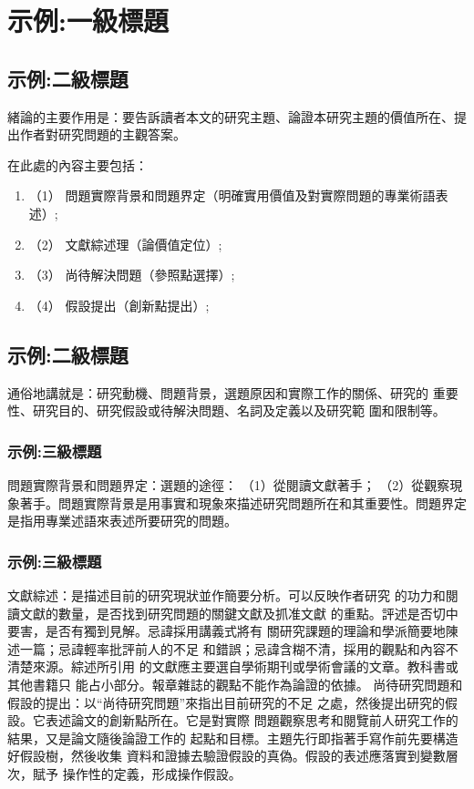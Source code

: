 \section{示例:一級標題}
\subsection{示例:二級標題}
緒論的主要作用是：要告訴讀者本文的研究主題、論證本研究主題的價值所在、提出作者對研究問題的主觀答案。

\par 在此處的內容主要包括：
\begin{enumerate}
	\item[] （1） 問題實際背景和問題界定（明確實用價值及對實際問題的專業術語表述）;
	\item[] （2） 文獻綜述理（論價值定位）;
	\item[]	（3） 尚待解決問題（參照點選擇）;
	\item[] （4） 假設提出（創新點提出）;
\end{enumerate}


\subsection{示例:二級標題}
\par 通俗地講就是：研究動機、問題背景，選題原因和實際工作的關係、研究的
重要性、研究目的、研究假設或待解決問題、名詞及定義以及研究範
圍和限制等。

\subsubsection{示例:三級標題}
\par  問題實際背景和問題界定：選題的途徑：
（1）從閱讀文獻著手；
（2）從觀察現象著手。問題實際背景是用事實和現象來描述研究問題所在和其重要性。問題界定是指用專業述語來表述所要研究的問題。
\clearpage

\subsubsection{示例:三級標題}
\par 文獻綜述：是描述目前的研究現狀並作簡要分析。可以反映作者研究
的功力和閱讀文獻的數量，是否找到研究問題的關鍵文獻及抓准文獻
的重點。評述是否切中要害，是否有獨到見解。忌諱採用講義式將有
關研究課題的理論和學派簡要地陳述一篇；忌諱輕率批評前人的不足
和錯誤；忌諱含糊不清，採用的觀點和內容不清楚來源。綜述所引用
的文獻應主要選自學術期刊或學術會議的文章。教科書或其他書籍只
能占小部分。報章雜誌的觀點不能作為論證的依據。
尚待研究問題和假設的提出：以“尚待研究問題”來指出目前研究的不足
之處，然後提出研究的假設。它表述論文的創新點所在。它是對實際
問題觀察思考和閱覽前人研究工作的結果，又是論文隨後論證工作的
起點和目標。主題先行即指著手寫作前先要構造好假設樹，然後收集
資料和證據去驗證假設的真偽。假設的表述應落實到變數層次，賦予
操作性的定義，形成操作假設。


